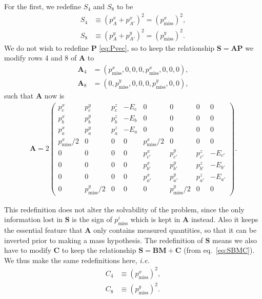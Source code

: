 \documentclass[twoside,english]{uiofysmaster}
\begin{document}
For the first, we redefine $S_4$ and $S_8$ to be 
\begin{align}
	S_4 &\equiv (p_A^x + p_{A'}^x)^2 = (p_\mathrm{miss}^x)^2, \label{eq:Svec_modified} \\
	S_8 &\equiv (p_A^y + p_{A'}^y)^2 = (p_\mathrm{miss}^y)^2. \nonumber
\end{align}
We do not wish to redefine $\mathbf{P}$ \eqref{eq:Pvec}, so to keep the relationship $\mathbf{S} = \mathbf{A}\mathbf{P}$ we modify rows 4 and 8 of $\mathbf{A}$ to
\begin{align}
	\mathbf{A}_4 &= (p_\mathrm{miss}^x, 0, 0, 0, p_\mathrm{miss}^x, 0, 0, 0),\\
	\mathbf{A}_8 &= (0, p_\mathrm{miss}^y, 0, 0, 0, p_\mathrm{miss}^y, 0, 0),\nonumber
\end{align}
such that $\mathbf{A}$ now is
\begin{align}
	\mathbf{A} = 2 \begin{pmatrix}
						p_c^x & p_c^y & p_c^z & -E_c & 0 & 0 & 0 & 0 \\
						p_b^x & p_b^y & p_b^z & -E_b & 0 & 0 & 0 & 0 \\
						p_a^x & p_a^y & p_a^z & -E_a & 0 & 0 & 0 & 0 \\
						p_\mathrm{miss}^x/2 & 0 & 0 & 0 & p_\mathrm{miss}^x/2 & 0 & 0 & 0\\
						0 & 0 & 0 & 0 & p_{c'}^x & p_{c'}^y & p_{c'}^z & -E_{c'} \\
						0 & 0 & 0 & 0 & p_{b'}^x & p_{b'}^y & p_{b'}^z & -E_{b'} \\
						0 & 0 & 0 & 0 & p_{a'}^x & p_{a'}^y & p_{a'}^z & -E_{a'} \\
						0 & p_\mathrm{miss}^y/2 & 0 & 0 & 0 & p_\mathrm{miss}^y/2 & 0 & 0
					\end{pmatrix}. \label{eq:Amatrix_modified}
\end{align}

This redefinition does not alter the solvability of the problem, since the only information lost in $\mathbf{S}$ is the sign of $p_\mathrm{miss}^i$ which is kept in $\mathbf{A}$ instead. Also it keeps the essential feature that $\mathbf{A}$ only contains measured quantities, so that it can be inverted prior to making a mass hypothesis. The redefinition of $\mathbf{S}$ means we also have to modify $\mathbf{C}$ to keep the relationship $\mathbf{S} = \mathbf{B} \mathbf{M} + \mathbf{C}$ (from eq.\ \eqref{eq:SBMC}). We thus make the same redefinitions here, {\it i.e.}
\begin{align}
	C_4 &\equiv (p_\mathrm{miss}^x)^2, \label{eq:Cvec_modified} \\
	C_8 &\equiv (p_\mathrm{miss}^y)^2. \nonumber
\end{align}
\end{document}
